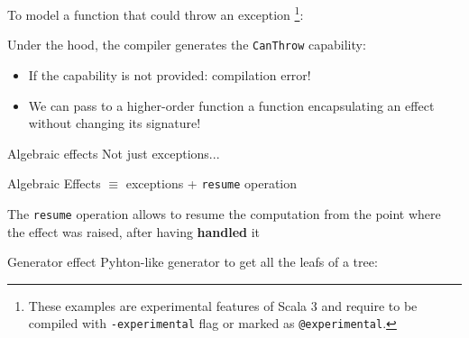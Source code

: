 \documentclass[aspectratio=169,xcolor=dvipsnames]{beamer}
\begin{document}

\begin{frame}
    To model a function that could throw an exception
    \footnote{\tiny
        These examples are experimental features of Scala 3 and require to be compiled with \texttt{-experimental} flag or marked as \texttt{@experimental}.
    }:
    
    
    Under the hood, the compiler generates the \texttt{CanThrow} capability:
    
\end{frame}


\begin{frame}
    \begin{itemize}
        \item<1-> If the capability is not provided: compilation error!
        
        \item<2-> We can pass to a higher-order function a function encapsulating an effect without changing its signature!
        
    \end{itemize}
\end{frame}


\begin{frame}{Algebraic effects}
    Not just exceptions...
    \begin{block}{}
        Algebraic Effects $\equiv$ exceptions + \texttt{resume} operation \cite{can-throw}
    \end{block}
    The \texttt{resume} operation allows to resume the computation from the point where the effect was raised, after having \textbf{handled} it
    
\end{frame}


\begin{frame}{Generator effect \cite{scalar-gears}}
    Pyhton-like generator to get all the leafs of a tree:

    
\end{frame}
\end{document}
